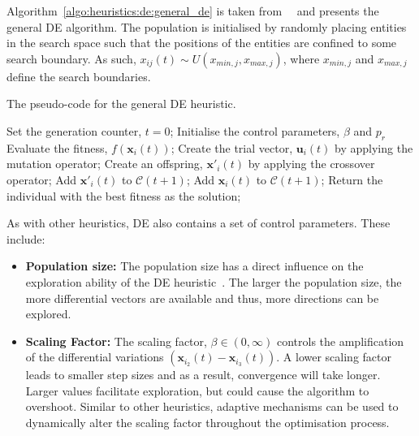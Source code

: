 {Algorithm~\ref{algo:heuristics:de:general_de} is taken from~\citeauthor{ref:engelbrecht:2007}~\cite{ref:engelbrecht:2007} and presents the general \acs{DE} algorithm. The population is initialised by randomly placing entities in the search space such that the positions of the entities are confined to some search boundary. As such, $x_{ij}(t) \sim U(x_{min,j}, x_{max,j})$, where $x_{min,j}$ and $x_{max,j}$ define the search boundaries.

\begin{algorithm}[htbp]
	\caption{The pseudo-code for the general \acs{DE} heuristic.}
	\label{algo:heuristics:de:general_de}
	\begin{algorithmic}
		\State Set the generation counter, $t = 0$;
		\State Initialise the control parameters, $\beta$ and $p_{r}$
		\State Evaluate the fitness, $f(\boldsymbol{x}_{i}(t))$;
		\State Create the trial vector, $\boldsymbol{u}_{i}(t)$ by applying the mutation operator;
		\State Create an offspring, $\boldsymbol{x}'_{i}(t)$ by applying the crossover operator;
		\State Add $\boldsymbol{x}'_{i}(t)$ to $\mathcal{C}(t+1)$;
		\Else
		\State Add $\boldsymbol{x}_{i}(t)$ to $\mathcal{C}(t+1)$;
		\EndIf
		\EndFor
		\EndWhile
		\State Return the individual with the best fitness as the solution;
	\end{algorithmic}
\end{algorithm}

As with other heuristics, \acs{DE} also contains a set of control parameters. These include:

\begin{itemize}
	\item \textbf{Population size:} The population size has a direct influence on the exploration ability of the \acs{DE} heuristic~\cite{ref:engelbrecht:2007}. The larger the population size, the more differential vectors are available and thus, more directions can be explored.

	\item \textbf{Scaling Factor:} The scaling factor, $\beta \in (0, \infty)$ controls the amplification of the differential variations $(\boldsymbol{x}_{i_{2}}(t) - \boldsymbol{x}_{i_{3}}(t))$. A lower scaling factor leads to smaller step sizes and as a result, convergence will take longer. Larger values facilitate exploration, but could cause the algorithm to overshoot. Similar to other heuristics, adaptive mechanisms can be used to dynamically alter the scaling factor throughout the optimisation process.


\end{itemize}}
